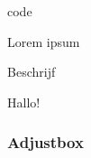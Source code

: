 \copyrightVincent

\begin{saveblock}{code}
    \begin{highlightblock}[linewidth=0.65\textwidth,gobble=8]

        Lorem ipsum
    
        Beschrijf \textellipsis
    
        {Hallo!}%
    \end{highlightblock}
\end{saveblock}

\begin{frame}
    \frametitle{Adjustbox}

    \begin{columns}
        \begin{column}{0.65\textwidth}
        \end{column}
        \begin{column}{0.35\textwidth}
        \end{column}
    \end{columns}
\end{frame}
